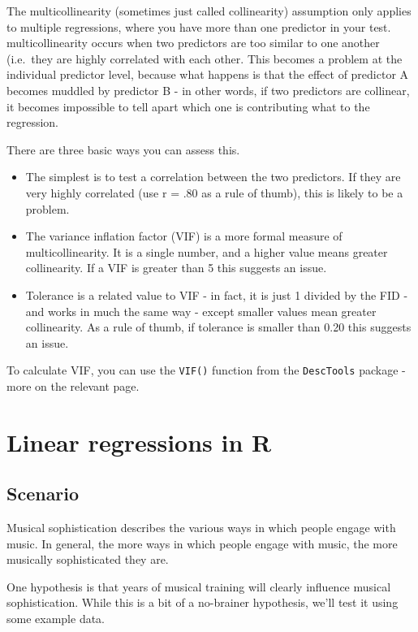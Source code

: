 \documentclass[
]{book}
\providecommand{\tightlist}{%
  \setlength{\itemsep}{0pt}\setlength{\parskip}{0pt}}
\begin{document}
The multicollinearity (sometimes just called collinearity) assumption only applies to multiple regressions, where you have more than one predictor in your test. multicollinearity occurs when two predictors are too similar to one another (i.e.~they are highly correlated with each other. This becomes a problem at the individual predictor level, because what happens is that the effect of predictor A becomes muddled by predictor B - in other words, if two predictors are collinear, it becomes impossible to tell apart which one is contributing what to the regression.

There are three basic ways you can assess this.

\begin{itemize}
\tightlist
\item
  The simplest is to test a correlation between the two predictors. If they are very highly correlated (use r = .80 as a rule of thumb), this is likely to be a problem.
\item
  The variance inflation factor (VIF) is a more formal measure of multicollinearity. It is a single number, and a higher value means greater collinearity. If a VIF is greater than 5 this suggests an issue.
\item
  Tolerance is a related value to VIF - in fact, it is just 1 divided by the FID - and works in much the same way - except smaller values mean greater collinearity. As a rule of thumb, if tolerance is smaller than 0.20 this suggests an issue.
\end{itemize}

To calculate VIF, you can use the \texttt{VIF()} function from the \texttt{DescTools} package - more on the relevant page.

\hypertarget{linear-regressions-in-r}{%
\section{Linear regressions in R}\label{linear-regressions-in-r}}

\hypertarget{scenario}{%
\subsection{Scenario}\label{scenario}}

Musical sophistication describes the various ways in which people engage with music. In general, the more ways in which people engage with music, the more musically sophisticated they are.

One hypothesis is that years of musical training will clearly influence musical sophistication. While this is a bit of a no-brainer hypothesis, we'll test it using some example data.
\end{document}
